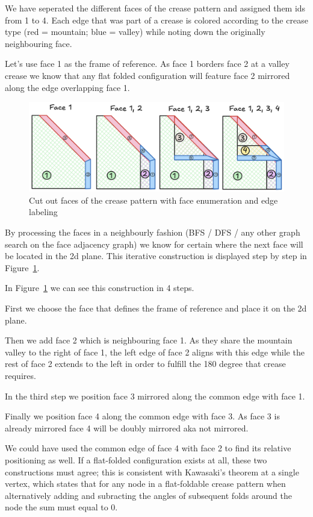 We have seperated the different faces of the crease pattern and assigned them ids from 1 to 4.
Each edge that was part of a crease is colored according to the crease type (red = mountain; blue = valley) while noting down the originally neighbouring face.

Let's use face 1 as the frame of reference.
As face 1 borders face 2 at a valley crease we know that any flat folded configuration will feature face 2 mirrored along the edge overlapping face 1.

\begin{figure}[h]
\centering
\includegraphics[width=\textwidth]{assets/demo_localflatfold.png}
\caption{Cut out faces of the crease pattern with face enumeration and edge labeling}
\label{fig:demo_localflatfold}
\end{figure}

By processing the faces in a neighbourly fashion (BFS / DFS / any other graph search on the face adjacency graph)
we know for certain where the next face will be located in the 2d plane.
This iterative construction is displayed step by step in Figure~\ref{fig:demo_localflatfold}.

In Figure~\ref{fig:demo_localflatfold} we can see this construction in 4 steps.

First we choose the face that defines the frame of reference and place it on the 2d plane.

Then we add face 2 which is neighbouring face 1. As they share the mountain valley to the right of face 1, the left edge
of face 2 aligns with this edge while the rest of face 2 extends to the left in order to fulfill the 180 degree that crease requires.

In the third step we position face 3 mirrored along the common edge with face 1.

Finally we position face 4 along the common edge with face 3.
As face 3 is already mirrored face 4 will be doubly mirrored aka not mirrored.

We could have used the common edge of face 4 with face 2 to find its relative positioning as well.
If a flat-folded configuration exists at all, these two constructions must agree; this is consistent with Kawasaki's
theorem at a single vertex, which states that for any node in a flat-foldable crease pattern when alternatively adding and subracting the angles of subsequent folds around the node the sum must equal to $0$. %

